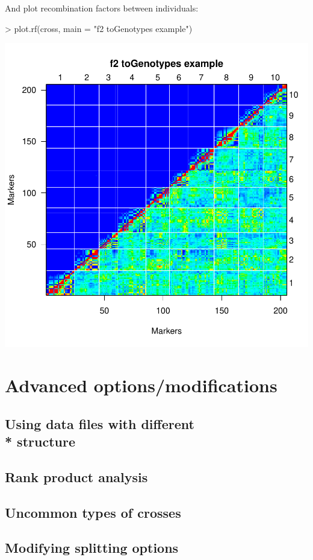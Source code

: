 \documentclass{article}
\begin{document}
{\noindent}And plot recombination factors between individuals:
\begin{Schunk}
\begin{Sinput}
> plot.rf(cross, main = "f2 toGenotypes example")
\end{Sinput}
\end{Schunk}
\includegraphics{manual-024}


\section{Advanced options/modifications}

\subsection{Using data files with different \\* structure}
\blindtext
\subsection{Rank product analysis}
\blindtext
\subsection{Uncommon types of crosses}
\blindtext
\subsection{Modifying splitting options}
\blindtext
\end{document}
